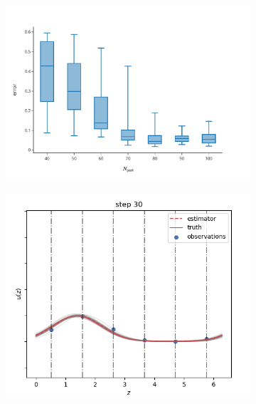 \begin{figure}
	\centering
	\begin{subfigure}{0.39\textwidth}
		\includegraphics[width=\textwidth]{images/app1d/error_support/error_part.pdf}
		\label{error_support1}
	\end{subfigure}
	\hfill
	\begin{subfigure}{0.29\textwidth}
		\includegraphics[width=\textwidth]{images/app1d/error_support/ok.png}
		\label{error_support2}
	\end{subfigure}
	\hfill
	\begin{subfigure}{0.29\textwidth}

\end{subfigure}
\end{figure}
